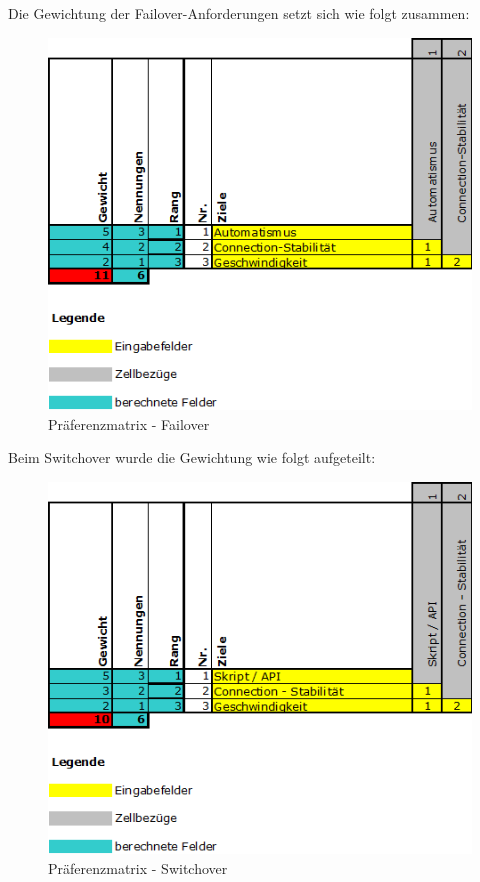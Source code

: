 \begin{flushleft}
    Die Gewichtung der Failover-Anforderungen setzt sich wie folgt zusammen:
    \begin{figure}[H]
        \centering
        \includegraphics[width=0.75\linewidth]{source/implementation/evaluation/requirements/preference_matrix_failover}
        \caption{Präferenzmatrix - Failover}
        \label{fig:preference_matrix_failover}
    \end{figure}
\end{flushleft}
\begin{flushleft}
    Beim Switchover wurde die Gewichtung wie folgt aufgeteilt:
    \begin{figure}[H]
        \centering
        \includegraphics[width=0.75\linewidth]{source/implementation/evaluation/requirements/preference_matrix_switchover}
        \caption{Präferenzmatrix - Switchover}
        \label{fig:preference_matrix_switchover}
    \end{figure}
\end{flushleft}
